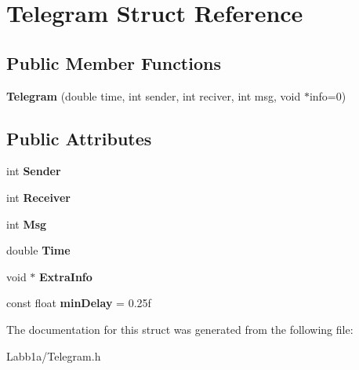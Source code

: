 \hypertarget{struct_telegram}{}\section{Telegram Struct Reference}
\label{struct_telegram}
\subsection*{Public Member Functions}
\begin{DoxyCompactItemize}
\item 
\hypertarget{struct_telegram_a43b0eab2642d7f2dd403b86232c8b26a}{}{\bfseries Telegram} (double time, int sender, int reciver, int msg, void $\ast$info=0)\label{struct_telegram_a43b0eab2642d7f2dd403b86232c8b26a}

\end{DoxyCompactItemize}
\subsection*{Public Attributes}
\begin{DoxyCompactItemize}
\item 
\hypertarget{struct_telegram_a62f6eba5c55435de663cf3224ef40abb}{}int {\bfseries Sender}\label{struct_telegram_a62f6eba5c55435de663cf3224ef40abb}

\item 
\hypertarget{struct_telegram_ad3f45bc5a490d11a4149c83715d48665}{}int {\bfseries Receiver}\label{struct_telegram_ad3f45bc5a490d11a4149c83715d48665}

\item 
\hypertarget{struct_telegram_a8b76562112ffb7a1e75587d0f1720a99}{}int {\bfseries Msg}\label{struct_telegram_a8b76562112ffb7a1e75587d0f1720a99}

\item 
\hypertarget{struct_telegram_abec42c98ec6d49b6b5893803cc0ca9cb}{}double {\bfseries Time}\label{struct_telegram_abec42c98ec6d49b6b5893803cc0ca9cb}

\item 
\hypertarget{struct_telegram_a426ac80e437a07d17f53fc05dd8f6b01}{}void $\ast$ {\bfseries Extra\+Info}\label{struct_telegram_a426ac80e437a07d17f53fc05dd8f6b01}

\item 
\hypertarget{struct_telegram_a904b9b926552629784c88532f18954f0}{}const float {\bfseries min\+Delay} = 0.\+25f\label{struct_telegram_a904b9b926552629784c88532f18954f0}

\end{DoxyCompactItemize}


The documentation for this struct was generated from the following file\+:\begin{DoxyCompactItemize}
\item 
Labb1a/Telegram.\+h\end{DoxyCompactItemize}
